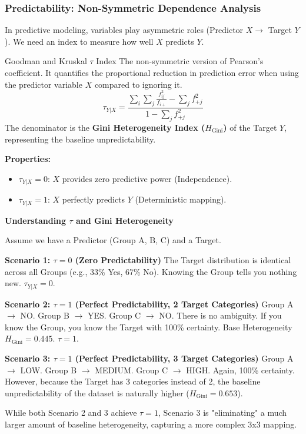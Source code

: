\subsubsection{Predictability: Non-Symmetric Dependence Analysis}

In predictive modeling, variables play asymmetric roles (Predictor $X \rightarrow$ Target $Y$). We need an index to measure how well $X$ predicts $Y$.

\pagebreak
\begin{defbox}{Goodman and Kruskal $\tau$ Index}
The non-symmetric version of Pearson's coefficient. It quantifies the proportional reduction in prediction error when using the predictor variable $X$ compared to ignoring it.
\begin{equation}
    \tau_{Y|X} = \frac{\sum_i \sum_j \frac{f_{ij}^2}{f_{i+}} - \sum_j f_{+j}^2}{1 - \sum_j f_{+j}^2}
\end{equation}
The denominator is the \textbf{Gini Heterogeneity Index ($H_{\text{Gini}}$)} of the Target $Y$, representing the baseline unpredictability.
\end{defbox}

\textbf{Properties:}
\begin{itemize}
    \item $\tau_{Y|X} = 0$: $X$ provides zero predictive power (Independence).
    \item $\tau_{Y|X} = 1$: $X$ perfectly predicts $Y$ (Deterministic mapping).
\end{itemize}

\vspace{0.2cm}
\begin{example}{\textbf{Understanding $\tau$ and Gini Heterogeneity}}

Assume we have a Predictor (Group A, B, C) and a Target.

\textbf{Scenario 1: $\tau=0$ (Zero Predictability)}
The Target distribution is identical across all Groups (e.g., 33\% Yes, 67\% No). Knowing the Group tells you nothing new. $\tau_{Y|X} = 0$.

\textbf{Scenario 2: $\tau=1$ (Perfect Predictability, 2 Target Categories)}
Group A $\rightarrow$ NO. Group B $\rightarrow$ YES. Group C $\rightarrow$ NO.
There is no ambiguity. If you know the Group, you know the Target with 100\% certainty. 
Base Heterogeneity $H_{\text{Gini}} = 0.445$. $\tau = 1$.

\textbf{Scenario 3: $\tau=1$ (Perfect Predictability, 3 Target Categories)}
Group A $\rightarrow$ LOW. Group B $\rightarrow$ MEDIUM. Group C $\rightarrow$ HIGH.
Again, 100\% certainty. However, because the Target has 3 categories instead of 2, the baseline unpredictability of the dataset is naturally higher ($H_{\text{Gini}} = 0.653$). 

While both Scenario 2 and 3 achieve $\tau=1$, Scenario 3 is "eliminating" a much larger amount of baseline heterogeneity, capturing a more complex 3x3 mapping.
\end{example}

